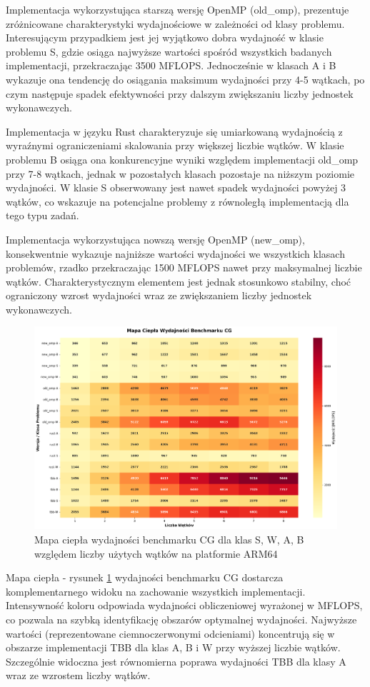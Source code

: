 Implementacja wykorzystująca starszą wersję OpenMP (old\_omp), prezentuje zróżnicowane charakterystyki wydajnościowe w zależności od klasy problemu. Interesującym przypadkiem jest jej wyjątkowo dobra wydajność w klasie problemu S, gdzie osiąga najwyższe wartości spośród wszystkich badanych implementacji, przekraczając 3500 MFLOPS. Jednocześnie w klasach A i B wykazuje ona tendencję do osiągania maksimum wydajności przy 4-5 wątkach, po czym następuje spadek efektywności przy dalszym zwiększaniu liczby jednostek wykonawczych.

Implementacja w języku Rust charakteryzuje się umiarkowaną wydajnością z wyraźnymi ograniczeniami skalowania przy większej liczbie wątków. W klasie problemu B osiąga ona konkurencyjne wyniki względem implementacji old\_omp przy 7-8 wątkach, jednak w pozostałych klasach pozostaje na niższym poziomie wydajności. W klasie S obserwowany jest nawet spadek wydajności powyżej 3 wątków, co wskazuje na potencjalne problemy z równoległą implementacją dla tego typu zadań.

Implementacja wykorzystująca nowszą wersję OpenMP (new\_omp), konsekwentnie wykazuje najniższe wartości wydajności we wszystkich klasach problemów, rzadko przekraczając 1500 MFLOPS nawet przy maksymalnej liczbie wątków. Charakterystycznym elementem jest jednak stosunkowo stabilny, choć ograniczony wzrost wydajności wraz ze zwiększaniem liczby jednostek wykonawczych.

\begin{figure}[H]
    \centering
    \includegraphics[width=\textwidth]{analiza/images/parallel/cg/x86/cg_mapa_ciepla_wydajnosci.png}
    \caption{Mapa ciepła wydajności benchmarku CG dla klas S, W, A, B względem liczby użytych wątków na platformie ARM64}
    \label{cg_heatmap_wydajnosci_x86_64}
\end{figure}
Mapa ciepła - rysunek \ref{cg_heatmap_wydajnosci_x86_64} wydajności benchmarku CG dostarcza komplementarnego widoku na zachowanie wszystkich implementacji. Intensywność koloru odpowiada wydajności obliczeniowej wyrażonej w MFLOPS, co pozwala na szybką identyfikację obszarów optymalnej wydajności. Najwyższe wartości (reprezentowane ciemnoczerwonymi odcieniami) koncentrują się w obszarze implementacji TBB dla klas A, B i W przy wyższej liczbie wątków. Szczególnie widoczna jest równomierna poprawa wydajności TBB dla klasy A wraz ze wzrostem liczby wątków.

